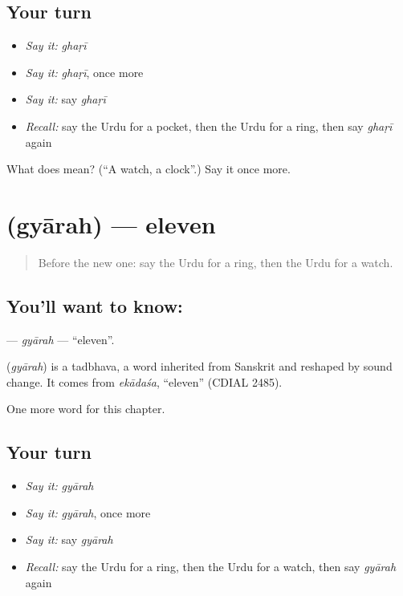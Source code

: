 \subsection*{Your turn}
\begin{itemize}
\raggedright
  \item \emph{Say it:} \emph{ghaṛī}
  \item \emph{Say it:} \emph{ghaṛī}, once more
  \item \emph{Say it:} say \emph{ghaṛī}
  \item \emph{Recall:} say the Urdu for a pocket, then the Urdu for a ring, then say \emph{ghaṛī} again
\end{itemize}

\begin{tcolorbox}[breakable,colback=teal!4,colframe=teal!35!black,title={Before you move on}]
What does  mean? (\textquotedblleft{}A watch, a clock\textquotedblright{}.) Say it once more.
\end{tcolorbox}
\section[\texorpdfstring{\ur{گیارہ} (gyārah)}{گیارہ (gyārah)}]{ (gyārah) — eleven}

\label{lesson:UR-C83-gyarah}



\begin{quote}
Before the new one: say the Urdu for a ring, then the Urdu for a watch.
\end{quote}

\subsection*{You'll want to know: }
\textbf{} — \emph{gyārah} — \textquotedblleft{}eleven\textquotedblright{}.

\begin{cousinweb}
\textbf{} (\emph{gyārah}) is a tadbhava, a word inherited from Sanskrit and reshaped by sound change. It comes from \emph{ekādaśa}, \textquotedblleft{}eleven\textquotedblright{} (CDIAL 2485).
\end{cousinweb}

\begin{grammarlens}[title={What you've built}]
One more word for this chapter.
\end{grammarlens}

\subsection*{Your turn}
\begin{itemize}
\raggedright
  \item \emph{Say it:} \emph{gyārah}
  \item \emph{Say it:} \emph{gyārah}, once more
  \item \emph{Say it:} say \emph{gyārah}
  \item \emph{Recall:} say the Urdu for a ring, then the Urdu for a watch, then say \emph{gyārah} again
\end{itemize}

